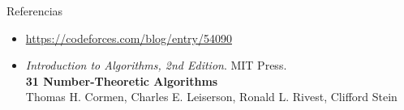 \documentclass{beamer}
\begin{document}
\begin{frame}{Referencias}

    \begin{itemize}
      \item \url{https://codeforces.com/blog/entry/54090}
      \item \textit{Introduction to Algorithms, 2nd Edition}. MIT Press. \\ \textbf{31 Number-Theoretic Algorithms}  \\ Thomas H. Cormen, Charles E. Leiserson, Ronald L. Rivest, Clifford Stein
    \end{itemize}
\end{frame}
\end{document}
